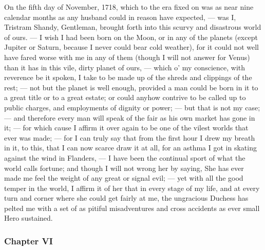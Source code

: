 \documentclass[
]{memoir}
\begin{document}
On the fifth day of November, 1718, which to the era fixed on was as
near nine calendar months as any husband could in reason have expected,
--- was I, Tristram Shandy, Gentleman, brought forth into this scurvy
and disastrous world of ours. --- I wish I had been born on the Moon, or
in any of the planets (except Jupiter or Saturn, because I never could
bear cold weather), for it could not well have fared worse with me in
any of them (though I will not answer for Venus) than it has in this
vile, dirty planet of ours, --- which o' my conscience, with reverence
be it spoken, I take to be made up of the shreds and clippings of the
rest; --- not but the planet is well enough, provided a man could be
born in it to a great title or to a great estate; or could anyhow
contrive to be called up to public charges, and employments of dignity
or power; --- but that is not my case; --- and therefore every man will
speak of the fair as his own market has gone in it; --- for which cause
I affirm it over again to be one of the vilest worlds that ever was
made; --- for I can truly say that from the first hour I drew my breath
in it, to this, that I can now scarce draw it at all, for an asthma I
got in skating against the wind in Flanders, --- I have been the
continual sport of what the world calls fortune; and though I will not
wrong her by saying, She has ever made me feel the weight of any great
or signal evil; --- yet with all the good temper in the world, I affirm
it of her that in every stage of my life, and at every turn and corner
where she could get fairly at me, the ungracious Duchess has pelted me
with a set of as pitiful misadventures and cross accidents as ever small
Hero sustained.

\hypertarget{chapter-vi}{%
\subsubsection*{Chapter VI}\label{chapter-vi}}
\end{document}
